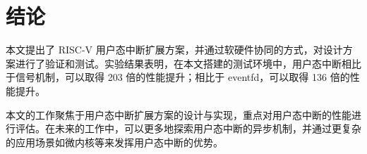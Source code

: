 
\chapter{结论}

本文提出了 RISC-V 用户态中断扩展方案，并通过软硬件协同的方式，对设计方案进行了验证和测试。实验结果表明，在本文搭建的测试环境中，用户态中断相比于信号机制，可以取得 203 倍的性能提升；相比于 eventfd，可以取得 136 倍的性能提升。

本文的工作聚焦于用户态中断扩展方案的设计与实现，重点对用户态中断的性能进行评估。在未来的工作中，可以更多地探索用户态中断的异步机制，并通过更复杂的应用场景如微内核等来发挥用户态中断的优势。